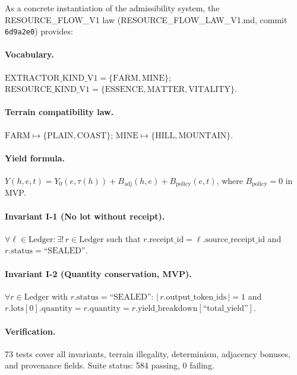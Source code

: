 \documentclass[11pt,a4paper]{article}
\theoremstyle{plain}
\theoremstyle{definition}
\theoremstyle{remark}
\begin{document}
As a concrete instantiation of the admissibility system,
the RESOURCE\_FLOW\_V1 law (RESOURCE\_FLOW\_LAW\_V1.md, commit \texttt{6d9a2e0})
provides:

\paragraph{Vocabulary.}
$\mathrm{EXTRACTOR\_KIND\_V1} = \{\text{FARM}, \text{MINE}\}$;
$\mathrm{RESOURCE\_KIND\_V1} = \{\text{ESSENCE}, \text{MATTER}, \text{VITALITY}\}$.

\paragraph{Terrain compatibility law.}
$\mathrm{FARM} \mapsto \{\text{PLAIN}, \text{COAST}\}$;
$\mathrm{MINE} \mapsto \{\text{HILL}, \text{MOUNTAIN}\}$.

\paragraph{Yield formula.}
$Y(h, e, t) = Y_0(e, \tau(h)) + B_{\mathrm{adj}}(h, e) + B_{\mathrm{policy}}(e, t)$,
where $B_{\mathrm{policy}} = 0$ in MVP.

\paragraph{Invariant I-1 (No lot without receipt).}
$\forall \ell \in \mathrm{Ledger}: \exists!\, r \in \mathrm{Ledger}$
such that $r.\mathrm{receipt\_id} = \ell.\mathrm{source\_receipt\_id}$
and $r.\mathrm{status} = \text{``SEALED''}$.

\paragraph{Invariant I-2 (Quantity conservation, MVP).}
$\forall r \in \mathrm{Ledger}$ with $r.\mathrm{status} = \text{``SEALED''}$:
$|\,r.\mathrm{output\_token\_ids}\,| = 1$
and $r.\mathrm{lots}[0].\mathrm{quantity} = r.\mathrm{quantity} = r.\mathrm{yield\_breakdown}[\text{``total\_yield''}]$.

\paragraph{Verification.}
73 tests cover all invariants, terrain illegality, determinism, adjacency bonuses,
and provenance fields.
Suite status: 584 passing, 0 failing.
\end{document}
